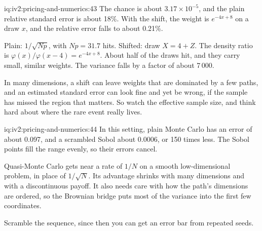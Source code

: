 \begin{solution}{iq:iv2:pricing-and-numerics:43}
The chance is about $3.17 \times 10^{-5}$, and the plain relative standard error is about 18\%. With the shift, the weight is $e^{-4x + 8}$ on a draw $x$, and the relative error falls to about 0.21\%.

Plain: $1/\sqrt{Np}$, with $Np = 31.7$ hits. Shifted: draw $X = 4 + Z$. The density ratio is $\varphi(x)/\varphi(x - 4) = e^{-4x + 8}$. About half of the draws hit, and they carry small, similar weights. The variance falls by a factor of about 7\,000.

In many dimensions, a shift can leave weights that are dominated by a few paths, and an estimated standard error can look fine and yet be wrong, if the sample has missed the region that matters. So watch the effective sample size, and think hard about where the rare event really lives.

\end{solution}

\begin{solution}{iq:iv2:pricing-and-numerics:44}
In this setting, plain Monte Carlo has an error of about 0.097, and a scrambled Sobol about 0.0006, or 150 times less. The Sobol points fill the range evenly, so their errors cancel.

Quasi-Monte Carlo gets near a rate of $1/N$ on a smooth low-dimensional problem, in place of $1/\sqrt N$. Its advantage shrinks with many dimensions and with a discontinuous payoff. It also needs care with how the path's dimensions are ordered, so the Brownian bridge puts most of the variance into the first few coordinates.

Scramble the sequence, since then you can get an error bar from repeated seeds.

\end{solution}

